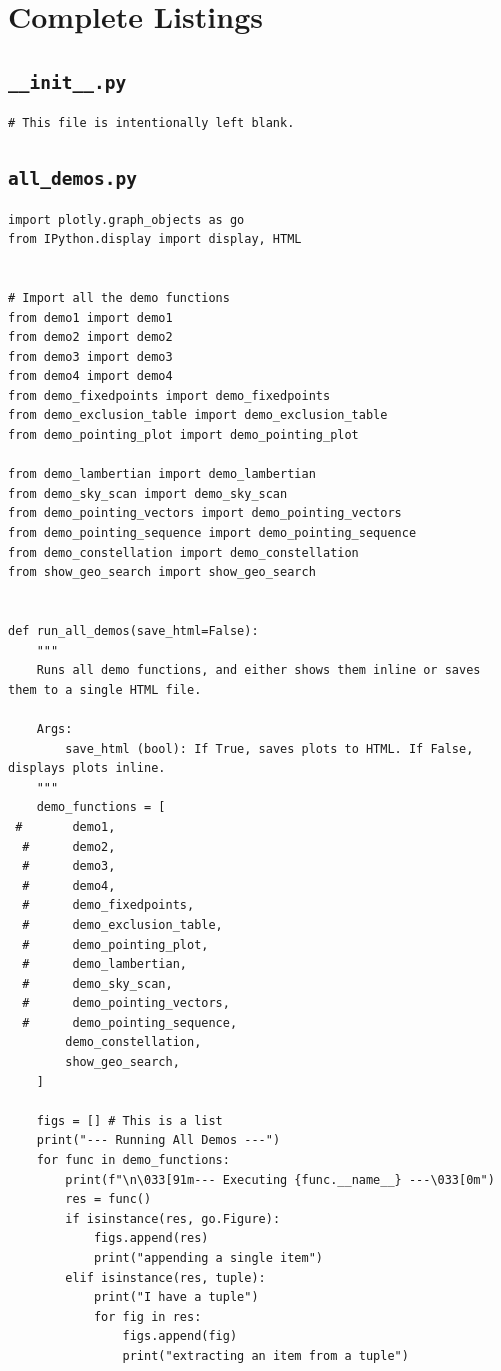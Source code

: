 \documentclass[11pt]{article}
\begin{document}
\section{Complete Listings}
\subsection{\texttt{\_\_init\_\_.py}}
\begin{Verbatim}
# This file is intentionally left blank.
\end{Verbatim}
\subsection{\texttt{all\_demos.py}}
\begin{Verbatim}
import plotly.graph_objects as go
from IPython.display import display, HTML


# Import all the demo functions
from demo1 import demo1
from demo2 import demo2
from demo3 import demo3
from demo4 import demo4
from demo_fixedpoints import demo_fixedpoints
from demo_exclusion_table import demo_exclusion_table
from demo_pointing_plot import demo_pointing_plot

from demo_lambertian import demo_lambertian
from demo_sky_scan import demo_sky_scan
from demo_pointing_vectors import demo_pointing_vectors
from demo_pointing_sequence import demo_pointing_sequence
from demo_constellation import demo_constellation
from show_geo_search import show_geo_search


def run_all_demos(save_html=False):
    """
    Runs all demo functions, and either shows them inline or saves them to a single HTML file.

    Args:
        save_html (bool): If True, saves plots to HTML. If False, displays plots inline.
    """
    demo_functions = [
 #       demo1,
  #      demo2,
  #      demo3,
  #      demo4,
  #      demo_fixedpoints,
  #      demo_exclusion_table,
  #      demo_pointing_plot,
  #      demo_lambertian,
  #      demo_sky_scan,
  #      demo_pointing_vectors,
  #      demo_pointing_sequence,
        demo_constellation,
        show_geo_search,
    ]

    figs = [] # This is a list
    print("--- Running All Demos ---")
    for func in demo_functions:
        print(f"\n\033[91m--- Executing {func.__name__} ---\033[0m")
        res = func()
        if isinstance(res, go.Figure):
            figs.append(res)
            print("appending a single item")
        elif isinstance(res, tuple):
            print("I have a tuple")
            for fig in res:
                figs.append(fig)
                print("extracting an item from a tuple")


\end{Verbatim}
\end{document}
